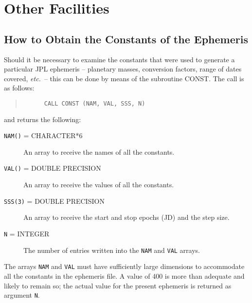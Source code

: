 \documentclass[twoside,11pt]{article}
\newcommand{\xlabel}[1]{}
\renewcommand{\_}{\texttt{\symbol{95}}}
\begin{document}
\section{\xlabel{other_facilities}Other Facilities}
\label{other_facilities}

\subsection{\xlabel{how_to_obtain_the_constants_of_the_ephemeris}How to Obtain the Constants of the Ephemeris}
\label{how_to_obtain_the_constants_of_the_ephemeris}

Should it be necessary to examine the constants that were used to generate
a particular JPL ephemeris -- planetary masses, conversion factors,
range of dates covered, \emph{etc.}\ -- this can be done by means of
the subroutine CONST.  The call is as follows:

\begin{quote}
\begin{verbatim}
      CALL CONST (NAM, VAL, SSS, N)
\end{verbatim}
\end{quote}

and returns the following:

\begin{description}
\item[\texttt{NAM()} = CHARACTER*6]\mbox{}

An array to receive the names of all the constants.

\item[\texttt{VAL()} = DOUBLE PRECISION]\mbox{}

An array to receive the values of all the constants.

\item[\texttt{SSS(3)} = DOUBLE PRECISION]\mbox{}

An array to receive the start and stop epochs (JD) and the step size.

\item[\texttt{N} = INTEGER]\mbox{}

The number of entries written into the \texttt{NAM} and \texttt{VAL} arrays.

\end{description}

The arrays \texttt{NAM} and \texttt{VAL} must have sufficiently large
dimensions to accommodate all the constants in the ephemeris file.
A value of 400 is more than adequate and likely to remain so;  the actual
value for the present ephemeris is returned as argument \texttt{N}.
\end{document}
